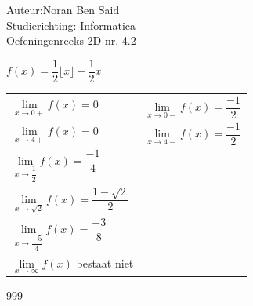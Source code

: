 \documentclass[a4paper]{article}
\begin{document}
  
\noindent \large Auteur:Noran Ben Said \\
\noindent \large Studierichting: Informatica\\
\noindent \large Oefeningenreeks 2D nr. 4.2\\

\medskip

\normalsize

$f(x) = \dfrac{1}{2}\lfloor x \rfloor - \dfrac{1}{2}x$\\

\begin{tabular}{l l}
$\lim\limits_{x \to 0+} f(x) = 0$ & $\lim\limits_{x \to 0-} f(x) = \dfrac{-1}{2}$\\

$\lim\limits_{x \to 4+} f(x) = 0$  & $\lim\limits_{x \to 4-} f(x) =\dfrac{-1}{2}$\\

$\lim\limits_{x \to \dfrac{1}{2}} f(x) = \dfrac{-1}{4}$\\

$\lim\limits_{x \to \sqrt{2}} f(x) = \dfrac{1-\sqrt{2}}{2}$\\

$\lim\limits_{x \to \dfrac{-5}{4}} f(x) = \dfrac{-3}{8}$\\

$\lim\limits_{x \to \infty} f(x)$ bestaat niet\\
\end{tabular}




\begin{thebibliography}{999}
\end{thebibliography}
\end{document}
